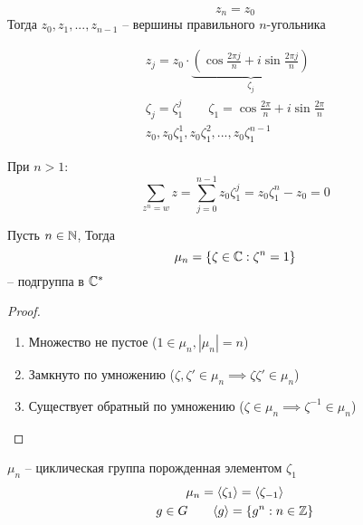 \documentclass[main]{subfiles}
\begin{document}
\begin{minipage}{0.45\textwidth}
\end{minipage}
\begin{minipage}{0.45\textwidth}
    \[z_n = z_0\]
    Тогда $z_0, z_1, ..., z_{n-1}$ -- вершины правильного $n$-угольника
\end{minipage}

\begin{gather*}
    z_j = z_0 \cdot \underbrace{\left(\cos \frac{2 \pi j}{n}+ i \sin \frac{2 \pi j}{n}\right)}_{\zeta_j}\\
    \zeta_j = \zeta_1^j \qquad \zeta_1 = \cos \frac{2 \pi}{n}+ i \sin \frac{2 \pi}{n}\\
    z_0, z_0 \zeta_1^1,  z_0 \zeta_1^2, ..., z_0 \zeta_1^{n-1}
\end{gather*}

\begin{corollary}
    При $n>1$:
    \[\sum_{z^n=w} z= \sum_{j=0}^{n-1} z_0\zeta_1^j = z_0 \zeta_1^n - z_0 = 0\]
\end{corollary}

\begin{proposition}
    Пусть $n\in \mathbb{N}$, Тогда
    \[\mu_n = \{\zeta \in \mathbb{C}: \zeta^n =1\}\]
    -- подгруппа в $\mathbb{C}^*$
\end{proposition}
\begin{proof}
    \begin{enumerate}
        \item Множество не пустое ($1\in \mu_n, |\mu_n|=n$)
        \item Замкнуто по умножению ($\zeta, \zeta' \in \mu_n \implies \zeta \zeta'\in \mu_n$)
        \item Существует обратный по умножению ($\zeta \in \mu_n \implies \zeta^{-1} \in \mu_n$)
    \end{enumerate}
\end{proof}
\begin{remark}
    $\mu_n$ -- циклическая группа порожденная элементом $\zeta_1$
    \begin{gather*}
        \mu_n = \langle \zeta_1 \rangle = \langle \zeta_{-1} \rangle\\
        g \in G \qquad \langle g \rangle = \{g^n:n \in \mathbb{Z}\}
    \end{gather*}
\end{remark}
\end{document}
